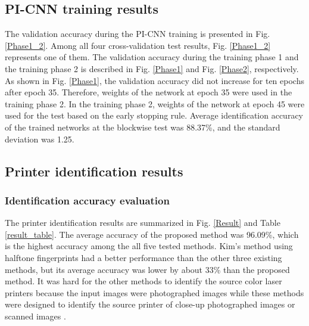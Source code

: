 \documentclass[5p, times]{elsarticle}
\begin{document}
\subsection{PI-CNN training results}
The validation accuracy during the PI-CNN training is presented in Fig. \ref{Phase1_2}. Among all four cross-validation test results, Fig. \ref{Phase1_2} represents one of them. The validation accuracy during the training phase 1 and the training phase 2 is described in Fig. \ref{Phase1} and Fig. \ref{Phase2}, respectively. As shown in Fig. \ref{Phase1}, the validation accuracy did not increase for ten epochs after epoch 35. Therefore, weights of the network at epoch 35 were used in the training phase 2. In the training phase 2, weights of the network at epoch 45 were used for the test based on the early stopping rule. Average identification accuracy of the trained networks at the blockwise test was 88.37\%, and the standard deviation was 1.25.

\subsection{Printer identification results}
\subsubsection{Identification accuracy evaluation}
The printer identification results are summarized in Fig. \ref{Result} and Table \ref{result_table}. The average accuracy of the proposed method was 96.09\%, which is the highest accuracy among the all five tested methods. Kim's method using halftone fingerprints had a better performance than the other three existing methods, but its average accuracy was lower by about 33\% than the proposed method. It was hard for the other methods to identify the source color laser printers because the input images were photographed images while these methods were designed to identify the source printer of close-up photographed images \cite{Kim1} or scanned images \cite{Ryu}\cite{Tsai1}.
\end{document}
